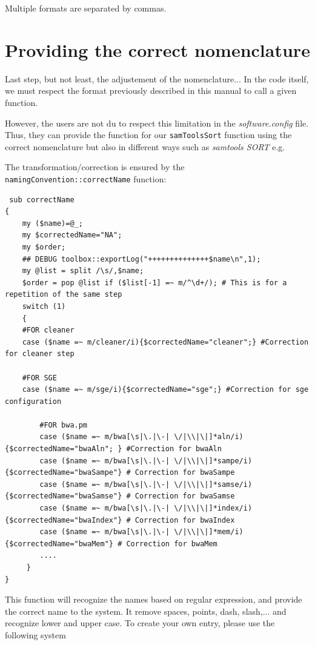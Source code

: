 \documentclass[a4paper,10pt]{report}
\begin{document}
Multiple formats are separated by commas.

\section{Providing the correct nomenclature}

Last step, but not least, the adjustement of the nomenclature... In the code itself, we must respect the format previously described in this manual to call a given function.

However, the users are not du to respect this limitation in the \emph{software.config} file. Thus, they can provide the function for our \texttt{samToolsSort} function using the correct nomenclature but also in different ways such as \textit{samtools SORT} e.g.

The transformation/correction is ensured by the \texttt{namingConvention::correctName} function:

\begin{lstlisting}
 sub correctName
{
    my ($name)=@_;
    my $correctedName="NA";
    my $order;
    ## DEBUG toolbox::exportLog("++++++++++++++$name\n",1);
    my @list = split /\s/,$name;
    $order = pop @list if ($list[-1] =~ m/^\d+/); # This is for a repetition of the same step
    switch (1)
    {
	#FOR cleaner
	case ($name =~ m/cleaner/i){$correctedName="cleaner";} #Correction for cleaner step
	
	#FOR SGE
	case ($name =~ m/sge/i){$correctedName="sge";} #Correction for sge configuration
	
        #FOR bwa.pm
        case ($name =~ m/bwa[\s|\.|\-| \/|\\|\|]*aln/i){$correctedName="bwaAln"; } #Correction for bwaAln
        case ($name =~ m/bwa[\s|\.|\-| \/|\\|\|]*sampe/i){$correctedName="bwaSampe"} # Correction for bwaSampe
        case ($name =~ m/bwa[\s|\.|\-| \/|\\|\|]*samse/i){$correctedName="bwaSamse"} # Correction for bwaSamse
        case ($name =~ m/bwa[\s|\.|\-| \/|\\|\|]*index/i){$correctedName="bwaIndex"} # Correction for bwaIndex
        case ($name =~ m/bwa[\s|\.|\-| \/|\\|\|]*mem/i){$correctedName="bwaMem"} # Correction for bwaMem
        ....
     }
}
\end{lstlisting}

This function will recognize the names based on regular expression, and provide the correct name to the system. It remove spaces, points, dash, slash,... and recognize lower and upper case.
To create your own entry, please use the following system
\end{document}
